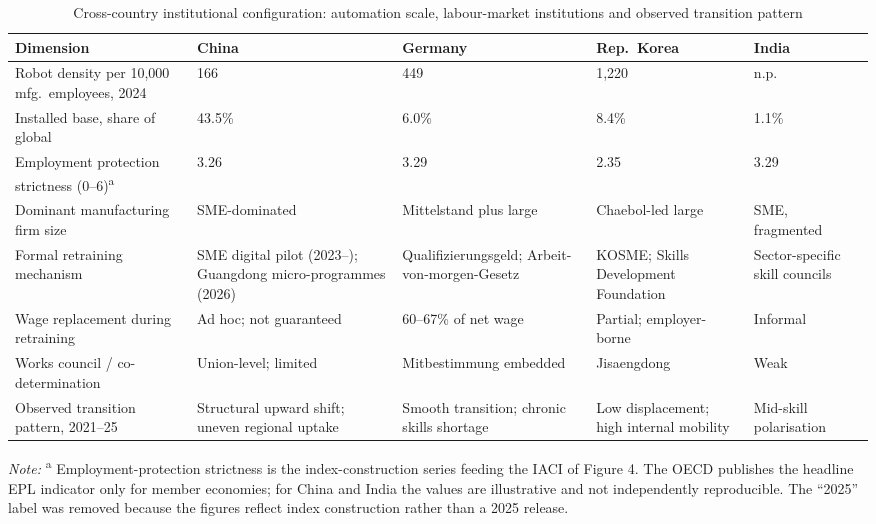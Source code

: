 \documentclass[12pt]{article}
\begin{document}
\begin{table}[!ht]
\centering
\caption{Cross-country institutional configuration: automation scale, labour-market institutions and observed transition pattern}
\label{tbl:cross_country}
\footnotesize
\setlength{\tabcolsep}{4pt}
\renewcommand{\arraystretch}{1.2}
\begin{tabular}{@{}p{3.3cm}p{2.6cm}p{2.4cm}p{2.4cm}p{3.5cm}@{}}
\toprule
Dimension & China & Germany & Rep.\ Korea & India \\
\midrule
Robot density per 10,000 mfg.\ employees, 2024 & 166 & 449 & 1,220 & n.p. \\
Installed base, share of global & 43.5\% & 6.0\% & 8.4\% & 1.1\% \\
Employment protection strictness (0--6)\textsuperscript{a} & 3.26 & 3.29 & 2.35 & 3.29 \\
Dominant manufacturing firm size & SME-dominated & Mittelstand plus large & Chaebol-led large & SME, fragmented \\
Formal retraining mechanism & SME digital pilot (2023--); Guangdong micro-programmes (2026) & Qualifizierungsgeld; Arbeit-von-morgen-Gesetz & KOSME; Skills Development Foundation & Sector-specific skill councils \\
Wage replacement during retraining & Ad hoc; not guaranteed & 60--67\% of net wage & Partial; employer-borne & Informal \\
Works council / co-determination & Union-level; limited & Mitbestimmung embedded & Jisaengdong & Weak \\
Observed transition pattern, 2021--25 & Structural upward shift; uneven regional uptake & Smooth transition; chronic skills shortage & Low displacement; high internal mobility & Mid-skill polarisation \\
\bottomrule
\end{tabular}

\vspace{4pt}

\footnotesize \textit{Note:} \textsuperscript{a} Employment-protection strictness is the index-construction series feeding the IACI of Figure 4. The OECD publishes the headline EPL indicator only for member economies; for China and India the values are illustrative and not independently reproducible. The ``2025'' label was removed because the figures reflect index construction rather than a 2025 release.

\vspace{4pt}

\end{table}
\end{document}
